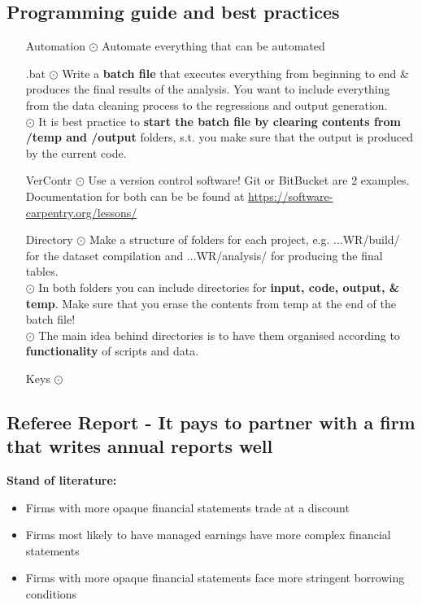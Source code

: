 \documentclass[11pt,a4paper,paranthesis]{article}
\begin{document}
\subsection{Programming guide and best practices}
\begin{enumerate}[leftmargin=*]
	\item[Automation] $\odot$ Automate everything that can be automated
	\item[.bat] $\odot$ Write a \textbf{batch file} that executes everything from beginning to end \& produces the final results of the analysis. You want to include everything from the data cleaning process to the regressions and output generation. \\
	$\odot$ It is best practice to \textbf{start the batch file by clearing contents from /temp and /output} folders, s.t. you make sure that the output is produced by the current code.
	\item[VerContr] $\odot$ Use a version control software! Git or BitBucket are 2 examples. Documentation for both can be be found at \url{https://software-carpentry.org/lessons/}
	\item[Directory] $\odot$ Make a structure of folders for each project, e.g. ...WR/build/ for the dataset compilation and ...WR/analysis/ for producing the final tables. \\
	$\odot$ In both folders you can include directories for \textbf{input, code, output, \& temp}. Make sure that you erase the contents from temp at the end of the batch file!\\
	$\odot$ The main idea behind directories is to have them organised according to \textbf{functionality} of scripts and data.
	\item[Keys] $\odot$ 
\end{enumerate}

\newpage
\subsection{Referee Report - It pays to partner with a firm that writes annual reports well}
\noindent \textbf{Stand of literature:}
\begin{itemize} [leftmargin=*]
	\item Firms with more opaque financial statements trade at a discount \citep{Hwang.2017}
	\item Firms most likely to have managed earnings have more complex financial statements \citep{Lo.2017}
	\item Firms with more opaque financial statements face more stringent borrowing conditions \citep{Ertugrul.2017}
\end{itemize}
\end{document}

